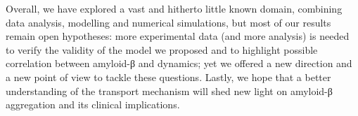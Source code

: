 Overall, we have explored a vast and hitherto little known domain, combining data analysis, modelling and numerical simulations, but most of our results remain open hypotheses: more experimental data (and more analysis) is needed to verify the validity of the  model we proposed and to highlight possible correlation between amyloid-β and  dynamics; yet we offered a new direction and a new point of view to tackle these questions. Lastly, we hope that a better understanding of the  transport mechanism will shed new light on amyloid-β aggregation and its clinical implications.
